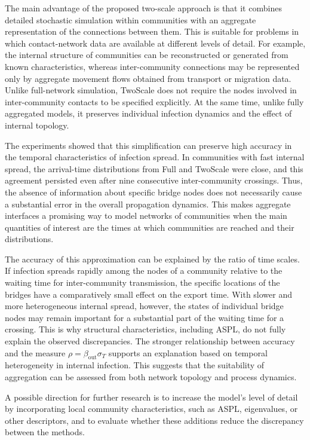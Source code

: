 \documentclass{ieeeaccess}
\newcommand{\Full}{\textup{Full}}
\newcommand{\TS}{\textup{TwoScale}}
\begin{document}
The main advantage of the proposed two-scale approach is that it combines detailed stochastic simulation within communities with an aggregate representation of the connections between them. This is suitable for problems in which contact-network data are available at different levels of detail. For example, the internal structure of communities can be reconstructed or generated from known characteristics, whereas inter-community connections may be represented only by aggregate movement flows obtained from transport or migration data. Unlike full-network simulation, \TS{} does not require the nodes involved in inter-community contacts to be specified explicitly. At the same time, unlike fully aggregated models, it preserves individual infection dynamics and the effect of internal topology.

The experiments showed that this simplification can preserve high accuracy in the temporal characteristics of infection spread. In communities with fast internal spread, the arrival-time distributions from \Full{} and \TS{} were close, and this agreement persisted even after nine consecutive inter-community crossings. Thus, the absence of information about specific bridge nodes does not necessarily cause a substantial error in the overall propagation dynamics. This makes aggregate interfaces a promising way to model networks of communities when the main quantities of interest are the times at which communities are reached and their distributions.

The accuracy of this approximation can be explained by the ratio of time scales. If infection spreads rapidly among the nodes of a community relative to the waiting time for inter-community transmission, the specific locations of the bridges have a comparatively small effect on the export time. With slower and more heterogeneous internal spread, however, the states of individual bridge nodes may remain important for a substantial part of the waiting time for a crossing. This is why structural characteristics, including ASPL, do not fully explain the observed discrepancies. The stronger relationship between accuracy and the measure $\rho=\beta_{\mathrm{out}}\sigma_T$ supports an explanation based on temporal heterogeneity in internal infection. This suggests that the suitability of aggregation can be assessed from both network topology and process dynamics.

A possible direction for further research is to increase the model's level of detail by incorporating local community characteristics, such as ASPL, eigenvalues, or other descriptors, and to evaluate whether these additions reduce the discrepancy between the methods.
\end{document}
